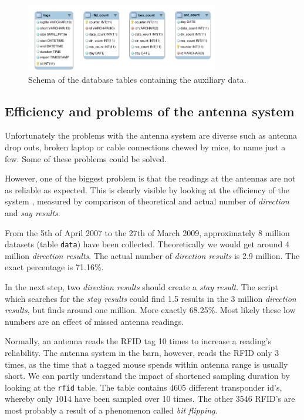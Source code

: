 \begin{figure}[htbp]
\begin{center}
  \includegraphics[width=0.75\textwidth]{assets/pdf/auxiliary_tables_schema.pdf}
  \caption[Schema of database tables containing the auxiliary data]{Schema of the database tables containing the auxiliary data.}
  \label{fig:auxiliary_tables}
\end{center}
\end{figure}

\subsection{Efficiency and problems of the antenna system}
\label{subsec:problems}

Unfortunately the problems with the antenna system are diverse such as antenna drop outs, broken laptop or cable connections chewed by mice, to name just a few. Some of these problems could be solved.

However, one of the biggest problem is that the readings at the antennas are not as reliable as expected. This is clearly visible by looking at the efficiency of the system , measured by comparison of theoretical and actual number of \textit{direction} and \textit{say results}. 

From the 5th of April 2007 to the 27th of March 2009, approximately 8 million datasets (table \lstinline|data|)  
have been collected. Theoretically we would get around 4 million \textit{direction results}. The actual number of \textit{direction  results} is 2.9 million. The exact percentage is 71.16\%.

In the next step, two \textit{direction results} should create a \textit{stay result}. The script which searches for the \textit{stay results} could find 1.5  results in the 3 million \textit{direction results}, but finds around one million. More exactly  68.25\%. Most likely these low numbers are an effect of missed antenna readings.
 
Normally, an antenna reads the RFID tag 10 times to increase a reading's reliability. The antenna system in the barn, however, reads the RFID only 3 times, as the time that a tagged mouse spends within antenna range is usually short. We can partly understand the impact of shortened sampling duration by looking at the \lstinline|rfid| table. The table contains 4605 different transponder id's, whereby only 1014 have been sampled over 10 times. The other 3546 RFID's are most probably a result of a phenomenon called \textit{bit flipping}.

